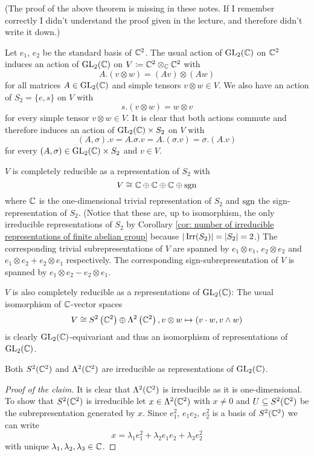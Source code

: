 (The proof of the above theorem is missing in these notes.
If I remember correctly I didn’t understand the proof given in the lecture, and therefore didn’t write it down.)


\begin{expl}
Let $e_1$, $e_2$ be the standard basis of $\mathbb{C}^2$. The usual action of $\operatorname{GL}_2(\mathbb{C})$ on $\mathbb{C}^2$ induces an action of $\operatorname{GL}_2(\mathbb{C})$ on $V \coloneqq \mathbb{C}^2 \otimes_{\mathbb{C}} \mathbb{C}^2$ with
  \[
    A.(v \otimes w) = (Av) \otimes (Aw)
  \]
  for all matrices $A \in \operatorname{GL}_2(\mathbb{C})$ and simple tensors $v \otimes w \in V$. We also have an action of $S_2 = \{e, s\}$ on $V$ with
  \[
    s.(v \otimes w) = w \otimes v
  \]
  for every simple tensor $v \otimes w \in V$. It is clear that both actions commute and therefore induces an action of $\operatorname{GL}_2(\mathbb{C}) \times S_2$ on $V$ with
  \[
    (A,\sigma).v = A.\sigma.v = A.(\sigma.v) = \sigma.(A.v)
  \]
  for every $(A,\sigma) \in \operatorname{GL}_2(\mathbb{C}) \times S_2$ and $v \in V$.
  
  $V$ is completely reducible as a representation of $S_2$ with
  \[
    V \cong \mathbb{C} \oplus \mathbb{C} \oplus \mathbb{C} \oplus \operatorname{sgn}
  \]
  where $\mathbb{C}$ is the one-dimensional trivial representation of $S_2$ and $\operatorname{sgn}$ the sign-representation of $S_2$. (Notice that these are, up to isomorphism, the only irreducible representations of $S_2$ by Corollary \ref{cor: number of irreducible representations of finite abelian group} because $|\operatorname{Irr}(S_2)| = |S_2| = 2$.) The corresponding trivial subrepresentations of $V$ are spanned by $e_1 \otimes e_1$, $e_2 \otimes e_2$ and $e_1 \otimes e_2 + e_2 \otimes e_1$ respectively. The corresponding sign-subrepresentation of $V$ is spanned by $e_1 \otimes e_2 - e_2 \otimes e_1$.
  
  $V$ is also completely reducible as a representations of $\operatorname{GL}_2(\mathbb{C})$: The usual isomorphism of $\mathbb{C}$-vector spaces
  \[
    V \cong S^2\left( \mathbb{C}^2 \right) \oplus \Lambda^2\left( \mathbb{C}^2 \right), v \otimes w \mapsto (v \cdot w, v \wedge w)
  \]
  is clearly $\operatorname{GL}_2(\mathbb{C})$-equivariant and thus an isomorphism of representations of $\operatorname{GL}_2(\mathbb{C})$.
  
  \begin{claim}
    Both $S^2(\mathbb{C}^2)$ and $\Lambda^2(\mathbb{C}^2)$ are irreducible as representations of $\operatorname{GL}_2(\mathbb{C})$.
  \end{claim}
  \begin{proof}[Proof of the claim]
    It is clear that $\Lambda^2(\mathbb{C}^2)$ is irreducible as it is one-dimensional. To show that $S^2(\mathbb{C}^2)$ is irreducible let $x \in \Lambda^2(\mathbb{C}^2)$ with $x \neq 0$ and $U \subseteq S^2(\mathbb{C}^2)$ be the subrepresentation generated by $x$. Since $e_1^2$, $e_1 e_2$, $e_2^2$ is a basis of $S^2(\mathbb{C}^2)$ we can write
    \[
      x = \lambda_1 e_1^2 + \lambda_2 e_1 e_2 + \lambda_3 e_2^2
    \]
    with unique $\lambda_1, \lambda_2, \lambda_3 \in \mathbb{C}$.
    

\end{proof}
\end{expl}
